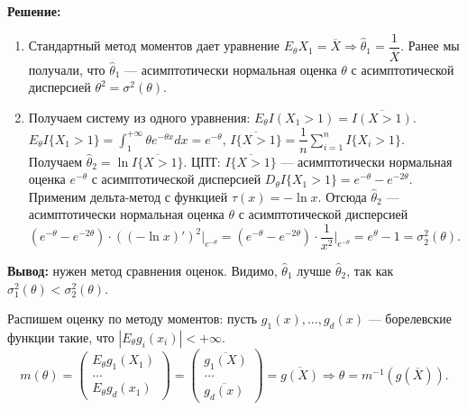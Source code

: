 \documentclass[12pt]{report}
\theoremstyle{definition}
\begin{document}
\textbf{Решение:}\\
\begin{enumerate}
	\item Стандартный метод моментов дает уравнение $E_\theta X_1 = \overline{X} \Rightarrow \hat{\theta}_1 = \dfrac{1}{\overline{X}}.$  Ранее мы получали, что $\hat{\theta}_1$ — асимптотически нормальная оценка $\theta$ с асимптотической дисперсией $\theta^2 = \sigma^2(\theta)$.
	\item Получаем систему из одного уравнения: $E_\theta I(X_1 > 1) = \overline{I(X > 1)}$. $E_\theta I\{X_1 > 1\} = \displaystyle{\int_1^{+\infty}}\theta e^{-\theta x}dx = e^{-\theta}$, $\overline{I\{X>1\}} = \dfrac{1}{n}\displaystyle{\sum_{i=1}^n I\{X_i > 1\}}$. Получаем $\hat{\theta}_2 = \ln \overline{I\{X > 1\}}$. ЦПТ: $\overline{I\{X > 1\}}$ — асимптотически нормальная оценка $e^{-\theta}$ с асимптотической дисперсией $D_\theta I\{X_1 > 1\} = e^{-\theta} - e^{-2\theta}$. Применим дельта-метод с функцией $\tau(x) = -\ln x$. Отсюда $\hat{\theta}_2$ — асимптотически нормальная оценка $\theta$ с асимптотической дисперсией $(e^{-\theta} - e^{-2\theta})\cdot((-\ln x)')^2\Biggr\rvert_{e^{-\theta}} = (e^{-\theta}-e^{-2\theta})\cdot\dfrac{1}{x^2}\Biggr\rvert_{e^{-\theta}} = e^{\theta} - 1 = \sigma_2^2(\theta)$.

\end{enumerate}
\textbf{Вывод:} нужен метод сравнения оценок. Видимо, $\hat{\theta}_1$ лучше $\hat{\theta}_2$, так как $\sigma_1^2(\theta) < \sigma_2^2(\theta)$.

Распишем оценку по методу моментов: пусть $g_1(x), \ldots, g_d(x)$ — борелевские функции такие, что $|E_\theta g_i(x_i)| < +\infty$.
$$m(\theta) = \begin{pmatrix}E_\theta g_1(X_1)\\ \ldots \\ E_\theta g_d(x_1)\end{pmatrix} = \begin{pmatrix}\overline{g_1(X)}\\ \ldots \\ \overline{g_d(x)}\end{pmatrix} = \overline{g(X)} \Rightarrow\hat{\theta} = m^{-1}(g(\overline{X})).$$
\end{document}
